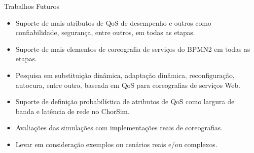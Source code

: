 \documentclass[xcolor=svgnames]{beamer}
\begin{document}
  \begin{frame}{Trabalhos Futuros}
      \begin{itemize}
	\item Suporte de mais atributos de QoS de desempenho e outros como confiabilidade, segurança, entre outros, em todas as etapas.
	\item Suporte de mais elementos de coreografia de serviços do BPMN2 em todas as etapas.
	\item Pesquisa em  substituição dinâmica, adaptação dinâmica, reconfiguração, autocura, entre outro,  baseada em QoS para coreografias de serviços Web.
	\item Suporte de definição probabilística de atributos de QoS como largura de banda e latência de rede no ChorSim.
	\item Avaliações das simulações com implementações reais de coreografias.
	\item Levar em consideração exemplos ou cenários reais e/ou complexos.
      \end{itemize}
  \end{frame}
  










\end{document}
